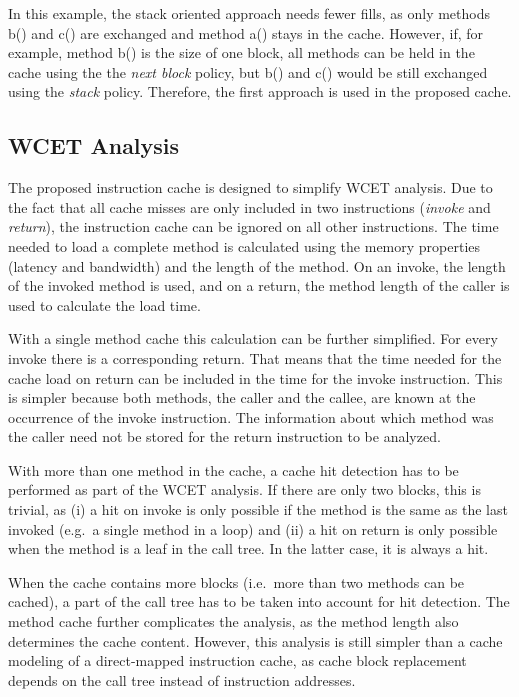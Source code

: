In this example, the stack oriented approach needs fewer fills, as
only methods b() and c() are exchanged and method a() stays in the
cache. However, if, for example, method b() is the size of one
block, all methods can be held in the cache using the the \emph{next
block} policy, but b() and c() would be still exchanged using the
\emph{stack} policy. Therefore, the first approach is used in the
proposed cache.


\subsection{WCET Analysis}

\label{sec:cache:wcet}

The proposed instruction cache is designed to simplify WCET
analysis. Due to the fact that all cache misses are only included in
two instructions (\emph{invoke} and \emph{return}), the instruction
cache can be ignored on all other instructions. The time needed to
load a complete method is calculated using the memory properties
(latency and bandwidth) and the length of the method. On an invoke,
the length of the invoked method is used, and on a return, the
method length of the caller is used to calculate the load time.

With a single method cache this calculation can be further
simplified. For every invoke there is a corresponding return. That
means that the time needed for the cache load on return can be
included in the time for the invoke instruction. This is simpler
because both methods, the caller and the callee, are known at the
occurrence of the invoke instruction. The information about which
method was the caller need not be stored for the return instruction
to be analyzed.

With more than one method in the cache, a cache hit detection has to
be performed as part of the WCET analysis. If there are only two
blocks, this is trivial, as (i) a hit on invoke is only possible if
the method is the same as the last invoked (e.g.\ a single method in
a loop) and (ii) a hit on return is only possible when the method is
a leaf in the call tree. In the latter case, it is always a hit.

When the cache contains more blocks (i.e.\ more than two methods can
be cached), a part of the call tree has to be taken into account for
hit detection. The method cache further complicates the analysis, as
the method length also determines the cache content. However, this
analysis is still simpler than a cache modeling of a direct-mapped
instruction cache, as cache block replacement depends on the call
tree instead of instruction addresses.

